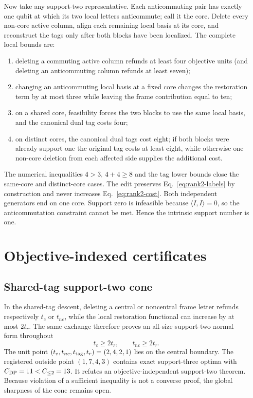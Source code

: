 \documentclass[a4paper,onecolumn,11pt,unpublished,noarxiv]{quantumarticle}
\begin{document}
Now take any support-two representative.  Each anticommuting pair has exactly one qubit at which its two local letters anticommute; call it the core.  Delete every non-core active column, align each remaining local basis at its core, and reconstruct the tags only after both blocks have been localized.  The complete local bounds are:
\begin{enumerate}
\item deleting a commuting active column refunds at least four objective units (and deleting an anticommuting column refunds at least seven);
\item changing an anticommuting local basis at a fixed core changes the restoration term by at most three while leaving the frame contribution equal to ten;
\item on a shared core, feasibility forces the two blocks to use the same local basis, and the canonical dual tag costs four;
\item on distinct cores, the canonical dual tags cost eight; if both blocks were already support one the original tag costs at least eight, while otherwise one non-core deletion from each affected side supplies the additional cost.
\end{enumerate}
The numerical inequalities $4>3$, $4+4\ge8$ and the tag lower bounds close the same-core and distinct-core cases.  The edit preserves Eq.~\eqref{eq:rank2-labels} by construction and never increases Eq.~\eqref{eq:rank2-cost}.  Both independent generators end on one core.  Support zero is infeasible because $\langle I,I\rangle=0$, so the anticommutation constraint cannot be met.  Hence the intrinsic support number is one.

\ProofObligationsTable
\FloatBarrier

\section{Objective-indexed certificates}

\subsection{Shared-tag support-two cone}

In the shared-tag descent, deleting a central or noncentral frame letter refunds respectively $t_c$ or $t_{nc}$, while the local restoration functional can increase by at most $2t_r$.  The same exchange therefore proves an all-size support-two normal form throughout
\begin{equation}
t_c\ge2t_r,\qquad t_{nc}\ge2t_r.
\end{equation}
The unit point $(t_c,t_{nc},t_{\rm tag},t_r)=(2,4,2,1)$ lies on the central boundary.  The registered outside point $(1,7,4,3)$ contains exact support-three optima with $C_{\rm DP}=11<C_{\le2}=13$.  It refutes an objective-independent support-two theorem.  Because violation of a sufficient inequality is not a converse proof, the global sharpness of the cone remains open.
\end{document}
